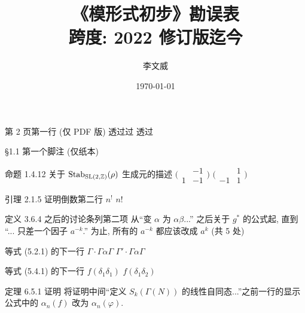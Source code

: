 \documentclass{AJerrata}
\title{\bfseries 《模形式初步》勘误表 \\ 跨度: 2022 修订版迄今}
\author{李文威}
\date{\today}
\begin{document}
	\maketitle
	
	\begin{Errata}
		\item[第 2 页第一行 (仅 PDF 版)]
		\Orig 透过过
		\Corr 透过
		
		\item[\S 1.1 第一个脚注 (仅纸本)]
		\Orig [50]
		\Corr [59]
		
		\item[命题 1.4.12 关于 $\operatorname{Stab}_{\operatorname{SL}(2, \mathbb{Z})}(\rho)$ 生成元的描述]
		\Orig $\bigl(\begin{smallmatrix} & -1 \\ 1 & -1 \end{smallmatrix}\bigr)$
		\Corr $\bigl(\begin{smallmatrix} & 1 \\ -1 & 1 \end{smallmatrix}\bigr)$
		
		\item[引理 2.1.5 证明倒数第二行]
		\Orig $n^!$
		\Corr $n!$
		
		\item[定义 3.6.4 之后的讨论条列第二项]
		从``变 $\alpha$ 为 $\alpha\beta$...'' 之后关于 $g^*$ 的公式起, 直到 ``... 只差一个因子 $a^{-k}$.'' 为止, 所有的 $a^{-k}$ 都应该改成 $a^k$ (共 5 处)
		
		
		\item[等式 (5.2.1) 的下一行]
		\Orig $\Gamma \cdot \Gamma \alpha \Gamma$
		\Corr $\Gamma' \cdot \Gamma \alpha \Gamma$
		
		\item[等式 (5.4.1) 的下一行]
		\Orig $f(\delta_1 \delta_1)$
		\Corr $f(\delta_1 \delta_2)$
		
		\item[定理 6.5.1 证明]
		将证明中间``定义 $S_k(\Gamma(N))$ 的线性自同态...''之前一行的显示公式中的 $\alpha_n(f)$ 改为 $\alpha_n(\varphi)$.
		
	\end{Errata}
\end{document}
